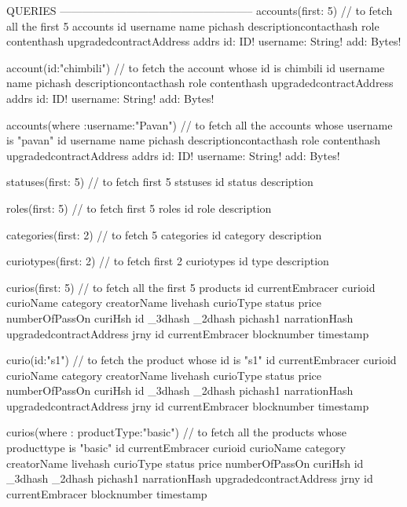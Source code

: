 QUERIES
-----------------------------------------------------
accounts(first: 5){     // to fetch all the first 5 accounts
    id
    username
    name
    pichash
    descriptioncontacthash
    role
	contenthash
    upgradedcontractAddress
	addrs {
	 id: ID!
     username: String!
     add: Bytes!
	}
  }
  
account(id:"chimbili"){      // to fetch the account whose id is chimbili
    id
    username
    name
    pichash
    descriptioncontacthash
    role
    contenthash
    upgradedcontractAddress
	addrs {
	 id: ID!
     username: String!
     add: Bytes!
	}
  }
  
accounts(where :{username:"Pavan"}){     //  to fetch all the accounts whose username is "pavan"
    id
    username
    name
    pichash
    descriptioncontacthash
    role
    contenthash
    upgradedcontractAddress
	addrs {
	 id: ID!
     username: String!
     add: Bytes!
	}
  }	
  
  
  
  statuses(first: 5) {    // to fetch first 5 ststuses
    id
    status
    description
  }
  
  roles(first: 5) {   // to fetch first 5 roles
    id
    role
    description
  }
  
  categories(first: 2){  // to fetch 5 categories
    id
    category
    description
  }
  
  curiotypes(first: 2){  // to fetch first 2 curiotypes
    id
    type
    description
  }
  
  curios(first: 5){   // to fetch all the first 5 products
    id
  	currentEmbracer
  	curioid
  	curioName
  	category
  	creatorName
  	livehash
  	curioType
  	status
  	price
  	numberOfPassOn
  	curiHsh {
  	  id
	  _3dhash
	  _2dhash
	  pichash1
	  narrationHash
  	}
  	upgradedcontractAddress
  	jrny{
      id
	  currentEmbracer
	  blocknumber
	  timestamp
    }
  }
  
  
  curio(id:"s1"){     // to fetch the product whose id is "s1"
    id
  	currentEmbracer
  	curioid
  	curioName
  	category
  	creatorName
  	livehash
  	curioType
  	status
  	price
  	numberOfPassOn
  	curiHsh {
  	  id
	  _3dhash
	  _2dhash
	  pichash1
	  narrationHash
  	}
  	upgradedcontractAddress
  	jrny{
      id
	  currentEmbracer
	  blocknumber
	  timestamp
    }
  }
  
  curios(where : {productType:"basic"}){     // to fetch all the products whose producttype is "basic"
    id
  	currentEmbracer
  	curioid
  	curioName
  	category
  	creatorName
  	livehash
  	curioType
  	status
  	price
  	numberOfPassOn
  	curiHsh {
  	  id
	  _3dhash
	  _2dhash
	  pichash1
	  narrationHash
  	}
  	upgradedcontractAddress
  	jrny{
      id
	  currentEmbracer
	  blocknumber
	  timestamp
    }
  }
  
